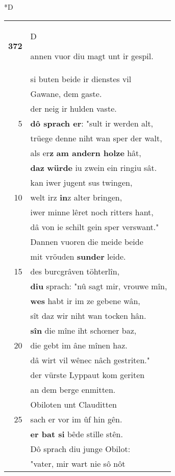 \documentclass[8pt,a4paper,notitlepage]{article}
\begin{document}
\begin{table}[ht]
\begin{minipage}[t]{0.5\linewidth}
\small
\begin{center}*D
\end{center}
\begin{tabular}{rl}
\textbf{372} & \begin{large}D\end{large}annen vuor diu magt unt ir gespil.\\ 
 & si buten beide ir dienstes vil\\ 
 & Gawane, dem gaste.\\ 
 & der neig ir hulden vaste.\\ 
5 & \textbf{dô sprach er}: "sult ir werden alt,\\ 
 & trüege denne niht wan sper der walt,\\ 
 & als er\textbf{z} \textbf{am andern holze} hât,\\ 
 & \textbf{daz} \textbf{würde} iu zwein ein ringiu sât.\\ 
 & kan iwer jugent sus twingen,\\ 
10 & welt irz \textbf{in}z alter bringen,\\ 
 & iwer minne lêret noch ritters hant,\\ 
 & dâ von ie schilt gein sper verswant."\\ 
 & Dannen vuoren die meide beide\\ 
 & mit vröuden \textbf{sunder} leide.\\ 
15 & des burcgrâven töhterlîn,\\ 
 & \textbf{diu} sprach: "nû sagt mir, vrouwe mîn,\\ 
 & \textbf{wes} habt ir im ze gebene wân,\\ 
 & sît daz wir niht wan tocken hân.\\ 
 & \textbf{sîn} die mîne iht schœner baz,\\ 
20 & die gebt im âne mînen haz.\\ 
 & dâ wirt vil wênec nâch gestriten."\\ 
 & der vürste Lyppaut kom geriten\\ 
 & an dem berge enmitten.\\ 
 & Obiloten unt Clauditten\\ 
25 & sach er vor im ûf hin gên.\\ 
 & \textbf{er bat si} bêde stille stên.\\ 
 & Dô sprach diu junge Obilot:\\ 
 & "vater, mir wart nie sô nôt\\ 

\end{tabular}
\end{minipage}
\end{table}
\end{document}
